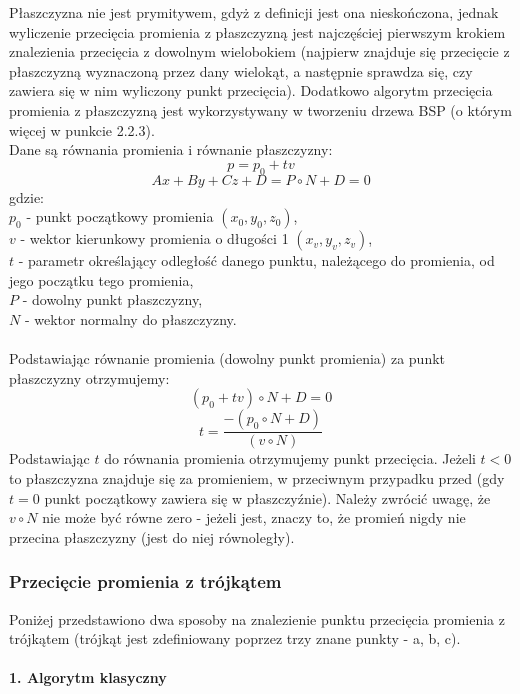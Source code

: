 Płaszczyzna nie jest prymitywem, gdyż z definicji jest ona nieskończona, jednak wyliczenie przecięcia promienia z płaszczyzną jest najczęściej pierwszym krokiem znalezienia przecięcia z dowolnym wielobokiem (najpierw znajduje się przecięcie z płaszczyzną wyznaczoną przez dany wielokąt, a następnie sprawdza się, czy zawiera się w nim wyliczony punkt przecięcia). Dodatkowo algorytm przecięcia promienia z płaszczyzną jest wykorzystywany w tworzeniu drzewa BSP (o którym więcej w punkcie 2.2.3). \\
\noindent
Dane są równania promienia i równanie płaszczyzny:
$$p = p_0 + tv$$
$$Ax + By + Cz + D = P \circ N + D = 0$$
gdzie:
\\
$p_0$ - punkt początkowy promienia $(x_0, y_0, z_0)$, \\
$v$ - wektor kierunkowy promienia o długości 1 $(x_v, y_v, z_v)$, \\
$t$ - parametr określający odległość danego punktu, należącego do promienia, od jego początku tego promienia, \\
$P$ - dowolny punkt płaszczyzny, \\
$N$ - wektor normalny do płaszczyzny. \\
\\
Podstawiając równanie promienia (dowolny punkt promienia) za punkt płaszczyzny otrzymujemy:
$$(p_0 + tv) \circ N + D = 0$$
$$t = \frac{-(p_0 \circ N + D)}{(v \circ N)}$$
Podstawiając $t$ do równania promienia otrzymujemy punkt przecięcia. Jeżeli $t < 0$ to płaszczyzna znajduje się za promieniem, w przeciwnym przypadku przed (gdy $t = 0$ punkt początkowy zawiera się w płaszczyźnie). Należy zwrócić uwagę, że $v \circ N$ nie może być równe zero - jeżeli jest, znaczy to, że promień nigdy nie przecina płaszczyzny (jest do niej równoległy).

\subsubsection{Przecięcie promienia z trójkątem}

Poniżej przedstawiono dwa sposoby na znalezienie punktu przecięcia promienia z trójkątem (trójkąt jest zdefiniowany poprzez trzy znane punkty - a, b, c).


\paragraph{1. Algorytm klasyczny}\mbox{} \\

